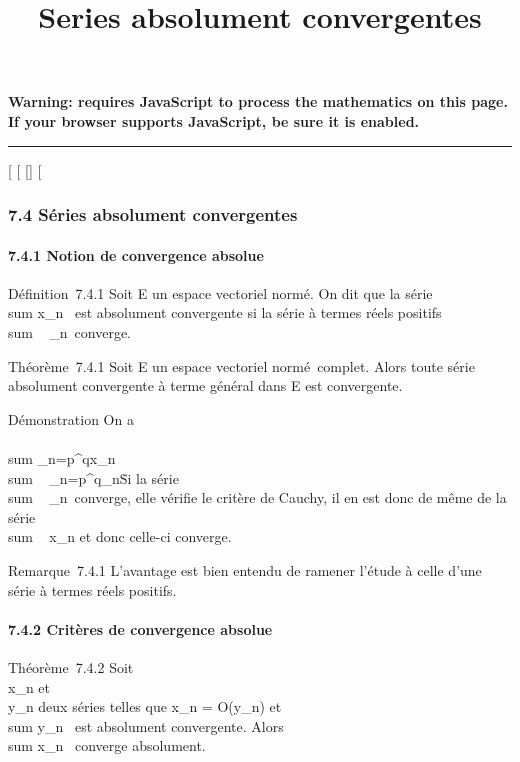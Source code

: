 \documentclass[]{article}
\title{Series absolument convergentes}
\author{}
\date{}
\begin{document}
\maketitle

\textbf{Warning: 
requires JavaScript to process the mathematics on this page.\\ If your
browser supports JavaScript, be sure it is enabled.}

\begin{center}\rule{3in}{0.4pt}\end{center}

[
[
[]
[

\subsubsection{7.4 Séries absolument convergentes}

\paragraph{7.4.1 Notion de convergence absolue}

Définition~7.4.1 Soit E un espace vectoriel normé. On dit que la série
\\sum  x_n~ est
absolument convergente si la série à termes réels positifs
\\sum ~
\x_n\
converge.

Théorème~7.4.1 Soit E un espace vectoriel normé~complet. Alors toute
série absolument convergente à terme général dans E est convergente.

Démonstration On a
\\\\sum
 _n=p^qx_n\
\leq\\sum ~
_n=p^q\x_n\.
Si la série \\sum ~
\x_n\
converge, elle vérifie le critère de Cauchy, il en est donc de même de
la série \\sum ~
x_n et donc celle-ci converge.

Remarque~7.4.1 L'avantage est bien entendu de ramener l'étude à celle
d'une série à termes réels positifs.

\paragraph{7.4.2 Critères de convergence absolue}

Théorème~7.4.2 Soit \\\sum
 x_n et \\\sum
 y_n deux séries telles que x_n = O(y_n)
et \\sum  y_n~
est absolument convergente. Alors
\\sum  x_n~
converge absolument.
\end{document}
